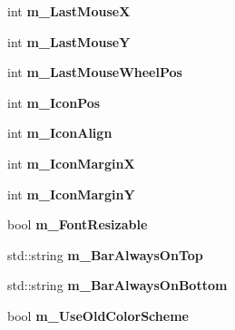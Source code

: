 \begin{DoxyCompactItemize}
\item 
\hypertarget{struct_c_tw_mgr_a7e096cbc203e00a22970e2030f06d9bc}{int {\bfseries m\+\_\+\+Last\+Mouse\+X}}\label{struct_c_tw_mgr_a7e096cbc203e00a22970e2030f06d9bc}

\item 
\hypertarget{struct_c_tw_mgr_ac64506bf4c44b2bd6024e4eb93a8f705}{int {\bfseries m\+\_\+\+Last\+Mouse\+Y}}\label{struct_c_tw_mgr_ac64506bf4c44b2bd6024e4eb93a8f705}

\item 
\hypertarget{struct_c_tw_mgr_ab47690c7c2872b21cb7d59846f6a1b1e}{int {\bfseries m\+\_\+\+Last\+Mouse\+Wheel\+Pos}}\label{struct_c_tw_mgr_ab47690c7c2872b21cb7d59846f6a1b1e}

\item 
\hypertarget{struct_c_tw_mgr_ac8da5189af62ad51546ef6c8118cca75}{int {\bfseries m\+\_\+\+Icon\+Pos}}\label{struct_c_tw_mgr_ac8da5189af62ad51546ef6c8118cca75}

\item 
\hypertarget{struct_c_tw_mgr_acaac54540f9f2feef3b2f27094216e5f}{int {\bfseries m\+\_\+\+Icon\+Align}}\label{struct_c_tw_mgr_acaac54540f9f2feef3b2f27094216e5f}

\item 
\hypertarget{struct_c_tw_mgr_a874af1f79255ece0ea078f12198b2b38}{int {\bfseries m\+\_\+\+Icon\+Margin\+X}}\label{struct_c_tw_mgr_a874af1f79255ece0ea078f12198b2b38}

\item 
\hypertarget{struct_c_tw_mgr_a24ff3e2c795099556f864021c3acf817}{int {\bfseries m\+\_\+\+Icon\+Margin\+Y}}\label{struct_c_tw_mgr_a24ff3e2c795099556f864021c3acf817}

\item 
\hypertarget{struct_c_tw_mgr_ac078f7540968f2fa89287c3707b8e022}{bool {\bfseries m\+\_\+\+Font\+Resizable}}\label{struct_c_tw_mgr_ac078f7540968f2fa89287c3707b8e022}

\item 
\hypertarget{struct_c_tw_mgr_a2d36cbfa3265e15f5894ed86e604275d}{std\+::string {\bfseries m\+\_\+\+Bar\+Always\+On\+Top}}\label{struct_c_tw_mgr_a2d36cbfa3265e15f5894ed86e604275d}

\item 
\hypertarget{struct_c_tw_mgr_a7ccc5c588d0c180e683de98a7e271548}{std\+::string {\bfseries m\+\_\+\+Bar\+Always\+On\+Bottom}}\label{struct_c_tw_mgr_a7ccc5c588d0c180e683de98a7e271548}

\item 
\hypertarget{struct_c_tw_mgr_aedcb70d1e43958928e99e9b2986526a3}{bool {\bfseries m\+\_\+\+Use\+Old\+Color\+Scheme}}\label{struct_c_tw_mgr_aedcb70d1e43958928e99e9b2986526a3}


\end{DoxyCompactItemize}

